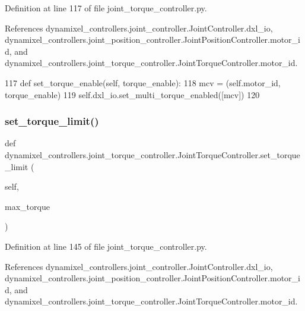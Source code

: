 Definition at line 117 of file joint\+\_\+torque\+\_\+controller.\+py.



References dynamixel\+\_\+controllers.\+joint\+\_\+controller.\+Joint\+Controller.\+dxl\+\_\+io, dynamixel\+\_\+controllers.\+joint\+\_\+position\+\_\+controller.\+Joint\+Position\+Controller.\+motor\+\_\+id, and dynamixel\+\_\+controllers.\+joint\+\_\+torque\+\_\+controller.\+Joint\+Torque\+Controller.\+motor\+\_\+id.


\begin{DoxyCode}
117     \textcolor{keyword}{def }set\_torque\_enable(self, torque\_enable):
118         mcv = (self.motor\_id, torque\_enable)
119         self.dxl\_io.set\_multi\_torque\_enabled([mcv])
120 
\end{DoxyCode}
\mbox{\label{classdynamixel__controllers_1_1joint__torque__controller_1_1_joint_torque_controller_a557b0cbe66a2423b4b342922d90347fa}} 
\subsubsection{\texorpdfstring{set\+\_\+torque\+\_\+limit()}{set\_torque\_limit()}}
{\footnotesize\ttfamily def dynamixel\+\_\+controllers.\+joint\+\_\+torque\+\_\+controller.\+Joint\+Torque\+Controller.\+set\+\_\+torque\+\_\+limit (\begin{DoxyParamCaption}\item[{}]{self,  }\item[{}]{max\+\_\+torque }\end{DoxyParamCaption})}



Definition at line 145 of file joint\+\_\+torque\+\_\+controller.\+py.



References dynamixel\+\_\+controllers.\+joint\+\_\+controller.\+Joint\+Controller.\+dxl\+\_\+io, dynamixel\+\_\+controllers.\+joint\+\_\+position\+\_\+controller.\+Joint\+Position\+Controller.\+motor\+\_\+id, and dynamixel\+\_\+controllers.\+joint\+\_\+torque\+\_\+controller.\+Joint\+Torque\+Controller.\+motor\+\_\+id.


